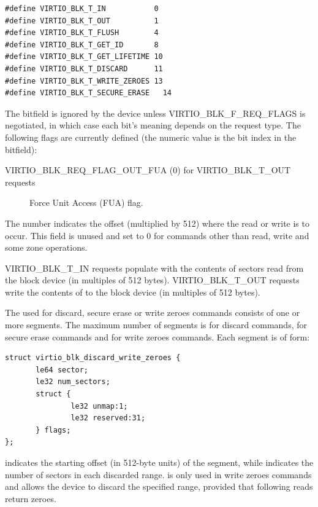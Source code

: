 \begin{lstlisting}
#define VIRTIO_BLK_T_IN           0
#define VIRTIO_BLK_T_OUT          1
#define VIRTIO_BLK_T_FLUSH        4
#define VIRTIO_BLK_T_GET_ID       8
#define VIRTIO_BLK_T_GET_LIFETIME 10
#define VIRTIO_BLK_T_DISCARD      11
#define VIRTIO_BLK_T_WRITE_ZEROES 13
#define VIRTIO_BLK_T_SECURE_ERASE   14
\end{lstlisting}

The  bitfield is ignored by the device unless
VIRTIO_BLK_F_REQ_FLAGS is negotiated, in which case each bit's meaning depends
on the request type. The following flags are currently defined (the numeric
value is the bit index in the  bitfield):

\begin{description}
\item[VIRTIO_BLK_REQ_FLAG_OUT_FUA (0) for VIRTIO_BLK_T_OUT requests] Force Unit
    Access (FUA) flag.
\end{description}

The  number indicates the offset (multiplied by 512) where
the read or write is to occur. This field is unused and set to 0 for
commands other than read, write and some zone operations.

VIRTIO_BLK_T_IN requests populate  with the contents of sectors
read from the block device (in multiples of 512 bytes).  VIRTIO_BLK_T_OUT
requests write the contents of  to the block device (in multiples
of 512 bytes).

The  used for discard, secure erase or write zeroes commands
consists of one or more segments. The maximum number of segments is
 for discard commands,  for
secure erase commands and  for write zeroes
commands.
Each segment is of form:

\begin{lstlisting}
struct virtio_blk_discard_write_zeroes {
       le64 sector;
       le32 num_sectors;
       struct {
               le32 unmap:1;
               le32 reserved:31;
       } flags;
};
\end{lstlisting}

 indicates the starting offset (in 512-byte units) of the
segment, while  indicates the number of sectors in each
discarded range.  is only used in write zeroes commands and allows
the device to discard the specified range, provided that following reads return
zeroes.

